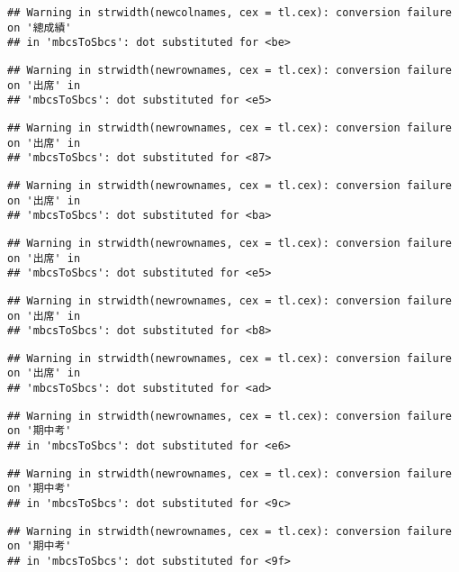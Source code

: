 \documentclass[
]{book}
\begin{document}
\begin{verbatim}
## Warning in strwidth(newcolnames, cex = tl.cex): conversion failure on '總成績'
## in 'mbcsToSbcs': dot substituted for <be>
\end{verbatim}

\begin{verbatim}
## Warning in strwidth(newrownames, cex = tl.cex): conversion failure on '出席' in
## 'mbcsToSbcs': dot substituted for <e5>
\end{verbatim}

\begin{verbatim}
## Warning in strwidth(newrownames, cex = tl.cex): conversion failure on '出席' in
## 'mbcsToSbcs': dot substituted for <87>
\end{verbatim}

\begin{verbatim}
## Warning in strwidth(newrownames, cex = tl.cex): conversion failure on '出席' in
## 'mbcsToSbcs': dot substituted for <ba>
\end{verbatim}

\begin{verbatim}
## Warning in strwidth(newrownames, cex = tl.cex): conversion failure on '出席' in
## 'mbcsToSbcs': dot substituted for <e5>
\end{verbatim}

\begin{verbatim}
## Warning in strwidth(newrownames, cex = tl.cex): conversion failure on '出席' in
## 'mbcsToSbcs': dot substituted for <b8>
\end{verbatim}

\begin{verbatim}
## Warning in strwidth(newrownames, cex = tl.cex): conversion failure on '出席' in
## 'mbcsToSbcs': dot substituted for <ad>
\end{verbatim}

\begin{verbatim}
## Warning in strwidth(newrownames, cex = tl.cex): conversion failure on '期中考'
## in 'mbcsToSbcs': dot substituted for <e6>
\end{verbatim}

\begin{verbatim}
## Warning in strwidth(newrownames, cex = tl.cex): conversion failure on '期中考'
## in 'mbcsToSbcs': dot substituted for <9c>
\end{verbatim}

\begin{verbatim}
## Warning in strwidth(newrownames, cex = tl.cex): conversion failure on '期中考'
## in 'mbcsToSbcs': dot substituted for <9f>
\end{verbatim}
\end{document}
